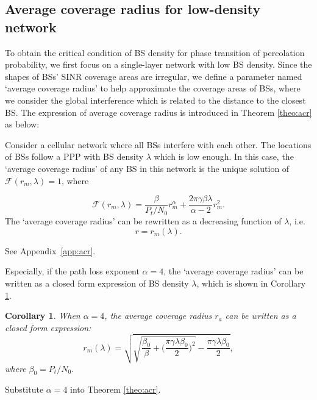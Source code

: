 \documentclass[final]{IEEEtran}
\newtheorem{corollary}{Corollary}
\begin{document}
\subsection{Average coverage radius for low-density network}
To obtain the critical condition of BS density for phase transition of percolation probability, we first focus on a single-layer network with low BS density. Since the shapes of BSs' SINR coverage areas are irregular, we define a parameter named `average coverage radius' to help approximate the coverage areas of BSs, where we consider the global interference which is related to the distance to the closest BS. The expression of average coverage radius is introduced in Theorem \ref{theo:acr} as below:
\begin{theorem}
\label{theo:acr}
    Consider a cellular network where all BSs interfere with each other. The locations of BSs follow a PPP with BS density $\lambda$ which is low enough. In this case, the `average coverage radius' of any BS in this network is the unique solution of $\mathcal{F}(r_m,\lambda)=1$, where

\begin{equation}
    \mathcal{F}(r_m,\lambda)=\frac{\beta}{P_t/N_0}r_{m}^{\alpha}+\frac{2\pi\gamma\beta\lambda}{\alpha-2}r^2_{m}.
\label{betaratio}
\end{equation}
The `average coverage radius' can be rewritten as a decreasing function of $\lambda$, i.e.
\begin{equation}
    r=r_m(\lambda).
\label{rewrite}
\end{equation}

\end{theorem}
\begin{IEEEproof}
    See Appendix~\ref{app:acr}.
\end{IEEEproof}

\indent Especially, if the path loss exponent $\alpha=4$, the `average coverage radius' can be written as a closed form expression of BS density $\lambda$, which is shown in Corollary \ref{cor:alpha4}.
\begin{corollary}\label{cor:alpha4}
    When $\alpha=4$, the average coverage radius $r_{a}$ can be written as a closed form expression:
\begin{equation}
    r_{m}(\lambda)=\sqrt{\sqrt{\frac{\beta_0}{\beta}+\bigg(\frac{\pi\gamma\lambda\beta_0}{2}\bigg)^2}-\frac{\pi\gamma\lambda\beta_0}{2}},
\end{equation}
where $\beta_0=P_t/N_0$.
\end{corollary}
\begin{IEEEproof}
    Substitute $\alpha=4$ into Theorem \ref{theo:acr}.
\end{IEEEproof}
\end{document}
